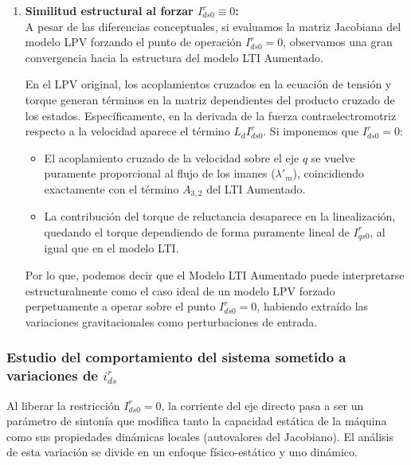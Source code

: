 \documentclass[12pt, a4paper,journal, onecolumn, compsoc]{IEEEtran}
\begin{document}
\begin{enumerate}
    \item \textbf{Similitud estructural al forzar $I_{ds0}^r \equiv 0$:} \\
    A pesar de las diferencias conceptuales, si evaluamos la matriz Jacobiana del modelo LPV forzando el punto de operación $I_{ds0}^r = 0$, observamos una gran convergencia hacia la estructura del modelo LTI Aumentado. 
    
    En el LPV original, los acoplamientos cruzados en la ecuación de tensión y torque generan términos en la matriz dependientes del producto cruzado de los estados. Específicamente, en la derivada de la fuerza contraelectromotriz respecto a la velocidad aparece el término $L_d I_{ds0}^r$. Si imponemos que $I_{ds0}^r = 0$:
    \begin{itemize}
        \item El acoplamiento cruzado de la velocidad sobre el eje $q$ se vuelve puramente proporcional al flujo de los imanes ($\lambda'_m$), coincidiendo exactamente con el término $A_{3,2}$ del LTI Aumentado.
        \item La contribución del torque de reluctancia desaparece en la linealización, quedando el torque dependiendo de forma puramente lineal de $I_{qs0}^r$, al igual que en el modelo LTI.
    \end{itemize}
    
    Por lo que, podemos decir que el Modelo LTI Aumentado puede interpretarse estructuralmente como el caso ideal de un modelo LPV forzado perpetuamente a operar sobre el punto $I_{ds0}^r = 0$, habiendo extraído las variaciones gravitacionales como perturbaciones de entrada.
\end{enumerate}
\subsubsection{Estudio del comportamiento del sistema sometido a variaciones de $i_{ds}^r$}
Al liberar la restricción $I_{ds0}^r = 0$, la corriente del eje directo pasa a ser un parámetro de sintonía que modifica tanto la capacidad estática de la máquina como sus propiedades dinámicas locales (autovalores del Jacobiano). El análisis de esta variación se divide en un enfoque físico-estático y uno dinámico.
\end{document}
